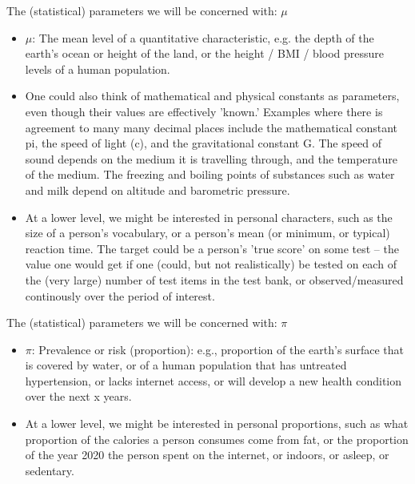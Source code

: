 \documentclass[10pt,handout]{beamer}\usepackage[]{graphicx}\usepackage[]{color}
\begin{document}
\begin{frame}{The (statistical) parameters we will be concerned with: $\mu$}
	

\begin{itemize}
	\item $\mu$: The mean level of a quantitative characteristic, e.g. the depth of the earth's ocean or height of the land, or the height / BMI / blood pressure levels of a human population. \pause 
	\item One could also think of mathematical and physical constants as parameters, even though their values are effectively 'known.' Examples where there is agreement to many many decimal places include the mathematical constant pi, the speed of light (c), and the gravitational constant G. The speed of sound depends on the medium it is travelling through, and the temperature of the medium. The freezing and boiling points of substances such as water and milk depend on altitude and barometric pressure.  \pause 
	\item At a lower level, we might be interested in personal characters, such as the size of a person's vocabulary, or a person's mean (or minimum, or typical) reaction time. The  target could be a person's 'true score' on some test -- the  value one would get if one (could, but not realistically) be tested on each of the (very large) number of test items in the test bank, or observed/measured continously over the period of interest.  

\end{itemize}

\end{frame}



\begin{frame}{The (statistical) parameters we will be concerned with: $\pi$}
	
	
	\begin{itemize}
	
		\item $\pi$: Prevalence or risk (proportion): e.g.,  proportion of the earth's surface that is covered by water, or of a human population that has untreated hypertension, or lacks internet access, or will develop a new health condition over the next x years. \pause 
		\item At a lower level, we might be interested in personal proportions, such as what proportion of the calories a person consumes come from fat, or the proportion of the year 2020 the person spent on the internet, or indoors, or asleep, or sedentary.	
	\end{itemize}
	
\end{frame}
\end{document}
